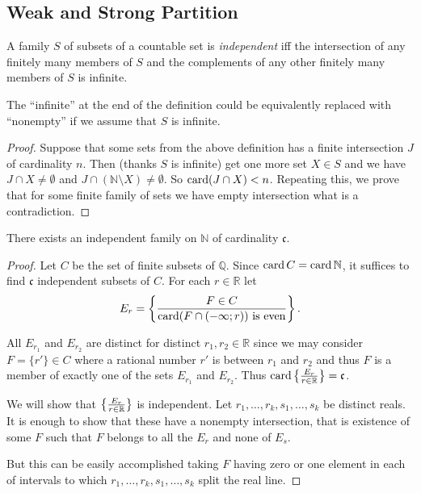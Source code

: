 \subsection{Weak and Strong Partition}
\begin{defn}
A family $S$ of subsets of a countable
set is \emph{independent} iff the intersection of any finitely many
members of $S$ and the complements of any other finitely many members
of $S$ is infinite.\end{defn}
\begin{lem}
The ``infinite'' at the end of the definition could be equivalently
replaced with ``nonempty'' if we assume that $S$ is infinite.\end{lem}
\begin{proof}
Suppose that some sets from the above definition has a finite intersection
$J$ of cardinality $n$. Then (thanks $S$ is infinite) get one more
set $X\in S$ and we have $J\cap X\ne\emptyset$ and $J\cap(\mathbb{N}\setminus X)\ne\emptyset$.
So $\operatorname{card}(J\cap X)<n$. Repeating this, we prove that for some finite
family of sets we have empty intersection what is a contradiction.\end{proof}
\begin{lem}
There exists an independent family on $\mathbb{N}$ of cardinality
$\mathfrak{c}$.\end{lem}
\begin{proof}
Let $C$ be the set of finite subsets of $\mathbb{Q}$. Since $\operatorname{card} C=\operatorname{card}\mathbb{N}$,
it suffices to find $\mathfrak{c}$ independent subsets of $C$. For
each $r\in\mathbb{R}$ let
\[
E_{r}=\left\{ \frac{F\in C}{\operatorname{card}(F\cap(-\infty;r))\text{ is even}}\right\}.
\]


All $E_{r_{1}}$ and $E_{r_{2}}$ are distinct for distinct $r_{1},r_{2}\in\mathbb{R}$
since we may consider $F=\{r'\}\in C$ where a rational number $r'$
is between $r_{1}$ and $r_{2}$ and thus $F$ is a member of exactly
one of the sets $E_{r_{1}}$ and $E_{r_{2}}$. Thus $\operatorname{card}\left\{ \frac{E_{r}}{r\in\mathbb{R}}\right\}=\mathfrak{c}$.

We will show that $\left\{ \frac{E_{r}}{r\in\mathbb{R}}\right\}$ is independent.
Let $r_{1},\dots,r_{k},s_{1},\ldots,s_{k}$ be distinct reals. It
is enough to show that these have a nonempty intersection, that is
existence of some $F$ such that $F$ belongs to all the $E_{r}$
and none of $E_{s}$.

But this can be easily accomplished taking $F$ having zero or one
element in each of intervals to which $r_{1},\ldots,r_{k},s_{1},\ldots,s_{k}$
split the real line.\end{proof}
